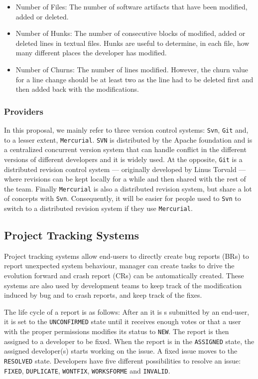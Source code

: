 \begin{itemize}
\item Number of Files: The number of software artifacts that have been modified, added or deleted.
\item Number of Hunks: The number of consecutive blocks of modified, added or deleted lines in textual files. Hunks are useful to determine, in each file, how many different places the developer has modified.
\item Number of Churns:  The number of lines modified. However, the churn value for a line change should be at least two as the line had to be deleted first and then added back with the modifications.
\end{itemize}

\subsubsection{Providers\label{sec:revision-provider}}

In this proposal, we mainly refer to three version control systems: {\tt Svn}, {\tt Git} and, to a lesser extent, {\tt Mercurial}.
{\tt SVN} is distributed by the Apache foundation and is a centralized concurrent version system that can handle conflict in the different versions of different developers and it is widely used.
At the opposite, {\tt Git} is a distributed revision control system --- originally developed by Linus Torvald --- where revisions can be kept locally for a while and then shared with the rest of the team.
Finally {\tt Mercurial} is also a distributed revision system, but share a lot of concepts with {\tt Svn}.
Consequently, it will be easier for people used to {\tt Svn} to switch to a distributed revision system if they use {\tt Mercurial}.

\subsection{Project Tracking Systems\label{sec:issue-tracking}}

Project tracking systems allow end-users to directly create bug reports (BRs) to report unexpected system behaviour,
manager can create tasks to drive the evolution forward and crash report (CRs) can be automatically created.
These systems are also used by development teams to keep track of the modification induced by bug and to crash reports, and keep track of the fixes.

The life cycle of a report is as follows: After an  it is s submitted by an end-user, it is set to the {\tt UNCONFIRMED} state until it receives enough votes or that a user with the proper permissions modifies its status to {\tt NEW}.
The report is then assigned to a developer to be fixed.
When the report is in the {\tt ASSIGNED} state, the assigned developer(s) starts working on the issue.
A fixed issue moves to the {\tt RESOLVED} state. Developers have five different possibilities to resolve an issue: {\tt FIXED}, {\tt DUPLICATE}, {\tt WONTFIX}, {\tt WORKSFORME} and {\tt INVALID}.

